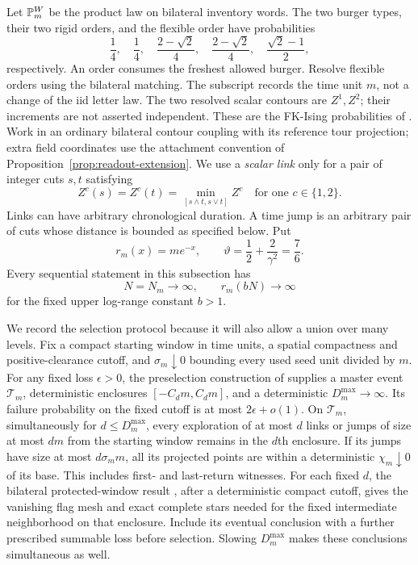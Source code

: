 Let \(\mathbb P_m^W\) be the product law on bilateral inventory words.
The two burger types, their two rigid orders, and the flexible
order have probabilities
\[
 \frac14,\quad\frac14,\quad
 \frac{2-\sqrt2}{4},\quad\frac{2-\sqrt2}{4},\quad
 \frac{\sqrt2-1}{2},
\]
respectively.  An order consumes the freshest allowed burger.
Resolve flexible orders using the bilateral matching.  The subscript
records the time unit \(m\), not a change of the iid letter law.
The two resolved scalar contours are \(Z^1,Z^2\); their increments
are not asserted independent.  These are the FK-Ising probabilities
of \cite[Proposition~3.1]{C}.  Work in an ordinary bilateral contour
coupling with its reference tour projection; extra field coordinates
use the attachment convention of Proposition~\ref{prop:readout-extension}.
We use a
\emph{scalar link} only for a pair of integer cuts \(s,t\) satisfying
\[
 Z^c(s)=Z^c(t)=\min_{[s\wedge t,s\vee t]}Z^c
 \quad\text{for one }c\in\{1,2\}.
\]
Links can have arbitrary chronological duration.  A time jump is
an arbitrary pair of cuts whose distance is bounded as specified
below.  Put
\[
 r_m(x)=m e^{-x},\qquad
 \vartheta=\frac12+\frac2{\gamma^2}=\frac76.
\]
Every sequential statement in this subsection has
\begin{equation}
\label{eq:selected-units}
 N=N_m\longrightarrow\infty,\qquad
 r_m(bN)\longrightarrow\infty
\end{equation}
for the fixed upper log-range constant \(b>1\).

We record the selection protocol because it will also allow a union
over many levels.  Fix a compact starting window in time units, a
spatial compactness and positive-clearance cutoff, and
\(\sigma_m\downarrow0\) bounding every used seed unit divided by \(m\).
For any fixed
loss \(\epsilon>0\), the preselection construction of
\cite[Section~11]{P} supplies a master event \(\mathcal T_m\),
deterministic enclosures \([-C_d m,C_d m]\), and a deterministic
\(D_m^{\max}\to\infty\).  Its failure probability on the fixed
cutoff is at most \(2\epsilon+o(1)\).  On \(\mathcal T_m\),
simultaneously for \(d\le D_m^{\max}\), every exploration of at most
\(d\) links or jumps of size at most \(dm\) from the starting
window remains in the \(d\)th enclosure.  If its jumps have size
at most \(d\sigma_m m\), all its projected points are within a
deterministic \(\chi_m\downarrow0\) of its base.  This includes
first- and last-return witnesses.  For each fixed \(d\), the
bilateral protected-window result \cite[Proposition~4.9]{C},
after a deterministic compact cutoff, gives the vanishing flag
mesh and exact complete stars needed for the fixed intermediate
neighborhood on that enclosure.  Include its eventual conclusion
with a further prescribed summable loss before selection.
Slowing \(D_m^{\max}\) makes these conclusions simultaneous as well.

